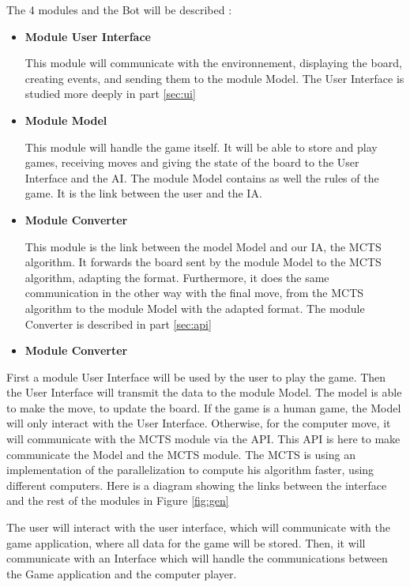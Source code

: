The 4 modules and the Bot will be described :

\begin{itemize}
\item \textbf{Module User Interface}

This module will communicate with the environnement, displaying the board, creating events, and sending them to the module Model. The User Interface is studied more deeply in part \ref{sec:ui}

\item \textbf{Module Model}

This module will handle the game itself. It will be able to store and play games, receiving moves and giving the state of the board to the User Interface and the AI. The module Model contains as well the rules of the game. It is the link between the user and the IA.

\item \textbf{Module Converter}

This module is the link between the model Model and our IA, the MCTS algorithm. It forwards the board sent by the module Model to the MCTS algorithm, adapting the format. Furthermore, it does the same communication in the other way with the final move, from the MCTS algorithm to the module Model with the adapted format. The module Converter is described in part \ref{sec:api}

\item \textbf{Module Converter}

\end{itemize}
First a module User Interface will be used by the user to play the game. Then the User Interface will transmit the data to the module Model. The model is able to make the move, to update the board. If the game is a human game, the Model will only interact with the User Interface. Otherwise, for the computer move, it will communicate with the MCTS module via the API. This API is here to make communicate the Model and the MCTS module. The MCTS is using an implementation of the parallelization to compute his algorithm faster, using different computers.
Here is a diagram showing the links between the interface and the rest of the modules in Figure \ref{fig:gen}


The user will interact with the user interface, which will communicate with the game application, where all data for the game will be stored. Then, it will communicate with an Interface which will handle the communications between the Game application and the computer player. 

